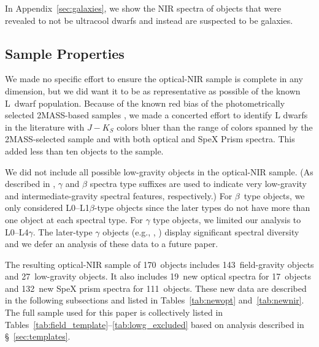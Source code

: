 \documentclass[modern,trackchanges]{aastex61}
\newcommand{\sample}{170}
\newcommand{\optField}{143}
\newcommand{\optLowG}{27}
\newcommand{\NewOptSpectra}{19} %
\newcommand{\NewOptObjects}{17} %
\newcommand{\NewPrismSpectra}{132} %
\newcommand{\NewPrismObjects}{111} %
\begin{document}
In Appendix~\ref{sec:galaxies}, we show the NIR spectra of objects that were revealed to not be ultracool dwarfs and instead are suspected to be galaxies.


%

\subsection{Sample Properties}

We made no specific effort to ensure the optical-NIR sample is complete in any dimension, but we did want it to be as representative as possible of the known L~dwarf population.
Because of the known red bias of the photometrically selected 2MASS-based samples \cite[Figure 3]{Schmidt10}, we made a concerted effort to identify L dwarfs in the literature with $J-K_S$ colors bluer than the range of colors spanned by the 2MASS-selected sample and with both optical and SpeX Prism spectra.
This added less than ten objects to the sample.

We did not include all possible low-gravity objects in the optical-NIR sample.
(As described in \cite{Cruz09_lowg}, $\gamma$ and $\beta$ spectra type suffixes are used to indicate very low-gravity and intermediate-gravity spectral features, respectively.)
For $\beta$~type objects, we only considered L0--L1$\beta$-type objects since the later types do not have more than one object at each spectral type.
For $\gamma$ type objects, we limited our analysis to L0--L4$\gamma$.
The later-type $\gamma$ objects (e.g., , \citealt{Cruz09_lowg}) display significant spectral diversity and we defer an analysis of these data to a future paper.

The resulting optical-NIR sample of \sample~objects includes \optField~field-gravity objects and \optLowG~low-gravity objects.
It also includes \NewOptSpectra~new optical spectra for \NewOptObjects~objects and \NewPrismSpectra~new SpeX prism spectra for \NewPrismObjects~objects.
These new data are described in the following subsections and listed in Tables~\ref{tab:newopt} and~\ref{tab:newnir}. The full sample used for this paper is collectively listed in Tables~\ref{tab:field_template}--\ref{tab:lowg_excluded} based on analysis described in \S~\ref{sec:templates}.
\end{document}
